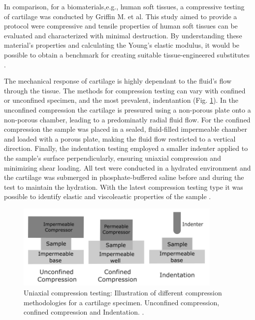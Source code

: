 In comparison, for a biomaterials,e.g., human soft tissues, a compressive testing of cartilage was conducted by Griffin M. et al. 
This study aimed to provide a protocol were compressive and tensile properties of human soft tissues can be evaluated 
and characterized with minimal destruction. By understanding these material's properties and calculating the Young's 
elastic modulus, it would be possible to obtain a benchmark for creating suitable tissue-engineered substitutes \cite{Griffin2016}. 

The mechanical response of cartilage is highly dependant to the fluid's flow through the tissue. The methods for compression 
testing can vary with confined or unconfined specimen, and the most prevalent, indentantion (Fig. \ref{fig:compressiontypes}).
In the unconfined compression the cartilage is pressured using a non-porous plate onto a non-porous chamber, 
leading to a predominatly radial fluid flow. For the confined compression the sample was placed in a sealed, 
fluid-filled impermeable chamber and loaded with a porous plate, making the fluid flow restricted to a vertical direction.
Finally, the indentation testing employed a smaller indenter applied to the sample's surface perpendicularly, ensuring 
uniaxial compression and minimizing shear loading. All test were conducted in a 
hydrated environment and the cartilage was submerged in phosphate-buffered saline before and during the test to maintain 
the hydration. With the latest compression testing type it was possible to identify elastic and viscoleastic properties 
of the sample \cite{Griffin2016}.

\begin{figure}%
        \centering
       \quad
       \includegraphics[width=10cm]{Images/chapter1/compressiontypes.png}%
       \caption{Uniaxial compression testing: Illustration of different compression methodologies for a cartilage specimen. Unconfined compression, confined compression and Indentation. \cite{Griffin2016}.}%
       \label{fig:compressiontypes}%
\end{figure}

